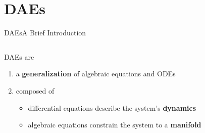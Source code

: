 
\section{\aclp{DAE}}

\begin{frame}{\aclp{DAE}}{A Brief Introduction}
  \begin{columns}
    \begin{column}{0.65\textwidth}
      \acsp{DAE} are
      \begin{enumerate}[<+->]
        \item a \textbf{generalization} of algebraic equations and \acsp{ODE} \\
        \item composed of
        \begin{itemize}
          \item<2-> differential equations describe the system's \textbf{dynamics}
          \item<2-> algebraic equations constrain the system to a \textbf{manifold} \\
        \end{itemize}
      \end{enumerate}
    \end{column}
    \begin{column}{0.35\textwidth}
      \centering

\end{column}
\end{columns}
\end{frame}
